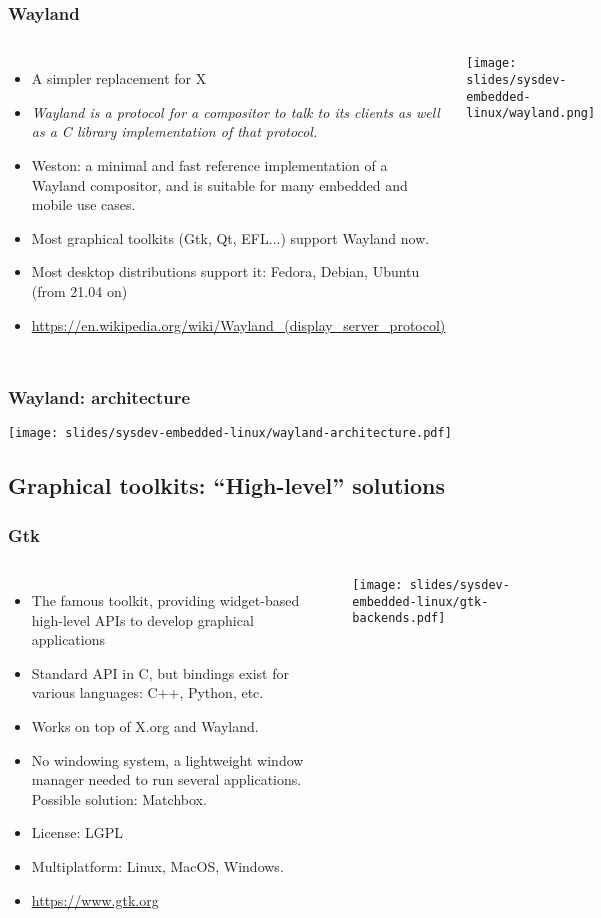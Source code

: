 \begin{frame}
  \frametitle{Wayland}
  \begin{columns}[T]
    \begin{itemize}
    \item A simpler replacement for X
    \item {\em Wayland is a protocol for a compositor to talk to
    its clients as well as a C library implementation of that protocol.}
    \item Weston: a minimal and fast reference implementation
          of a Wayland compositor, and is suitable for many embedded
          and mobile use cases.
    \item Most graphical toolkits (Gtk, Qt, EFL...) support Wayland now.
    \item Most desktop distributions support it: Fedora, Debian, Ubuntu
          (from 21.04 on)
    \item \url{https://en.wikipedia.org/wiki/Wayland_(display_server_protocol)}
    \end{itemize}
    \texttt{[image: slides/sysdev-embedded-linux/wayland.png]}
  \end{columns}
\end{frame}

\begin{frame}
  \frametitle{Wayland: architecture}
  \begin{center}
    \texttt{[image: slides/sysdev-embedded-linux/wayland-architecture.pdf]}
  \end{center}
\end{frame}


\subsection[High-level Toolkits]{Graphical toolkits: ``High-level''
  solutions}

\begin{frame}
  \frametitle{Gtk}
  \begin{columns}
    \begin{itemize}
    \item The famous toolkit, providing widget-based high-level APIs to
      develop graphical applications
    \item Standard API in C, but bindings exist for various languages:
      C++, Python, etc.
    \item Works on top of X.org and Wayland.
    \item No windowing system, a lightweight window manager needed to
      run several applications. Possible solution: Matchbox.
    \item License: LGPL
    \item Multiplatform: Linux, MacOS, Windows.
    \item \url{https://www.gtk.org}
    \end{itemize}
    \texttt{[image: slides/sysdev-embedded-linux/gtk-backends.pdf]}
  \end{columns}
\end{frame}

